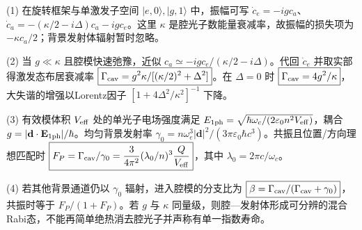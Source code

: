 (1) 在旋转框架与单激发子空间 \(|e,0\rangle,|g,1\rangle\) 中，振幅可写 \(\dot c_e=-igc_a\)、\(\dot c_a=-(\kappa/2-i\Delta)c_a-igc_e\)。这里 \(\kappa\) 是腔光子数能量衰减率，故振幅的损失项为 \(-\kappa c_a/2\)；背景发射体辐射暂时忽略。

(2) 当 \(g\ll\kappa\) 且腔模快速弛豫，近似 \(c_a\simeq-igc_e/(\kappa/2-i\Delta)\)。代回 \(\dot c_e\) 并取实部得激发态布居衰减率 \(\boxed{\Gamma_{\rm cav}=g^2\kappa/[(\kappa/2)^2+\Delta^2]}\)。在 \(\Delta=0\) 时 \(\boxed{\Gamma_{\rm cav}=4g^2/\kappa}\)，大失谐的增强以Lorentz因子 \([1+4\Delta^2/\kappa^2]^{-1}\) 下降。

(3) 有效模体积 \(V_{\rm eff}\) 处的单光子电场强度满足 \(E_{1\rm ph}=\sqrt{\hbar\omega_c/(2\varepsilon_0n^2V_{\rm eff})}\)，耦合 \(g=|\mathbf d\cdot\mathbf E_{1\rm ph}|/\hbar\)。均匀背景发射率 \(\gamma_0=n\omega_e^3|\mathbf d|^2/(3\pi\varepsilon_0\hbar c^3)\)。共振且位置/方向理想匹配时 \(\boxed{F_P=\Gamma_{\rm cav}/\gamma_0=\frac{3}{4\pi^2}(\lambda_0/n)^3\frac Q{V_{\rm eff}}}\)，其中 \(\lambda_0=2\pi c/\omega_c\)。

(4) 若其他背景通道仍以 \(\gamma_0\) 辐射，进入腔模的分支比为 \(\boxed{\beta=\Gamma_{\rm cav}/(\Gamma_{\rm cav}+\gamma_0)}\)，共振时等于 \(F_P/(1+F_P)\)。若 \(g\) 与 \(\kappa\) 同量级，则腔—发射体形成可分辨的混合Rabi态，不能再简单绝热消去腔光子并声称有单一指数寿命。
